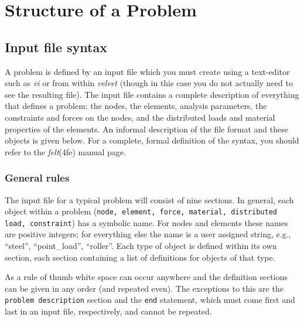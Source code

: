 
\newpage{\pagestyle{empty}\cleardoublepage}

\chapter{Structure of a \felt{} Problem}
\label{problem}

\section{Input file syntax}
\label{problem.syntax}
A \felt{} problem is defined by an input file which you must create using 
a text-editor such as {\em vi} or from within {\em velvet}
(though in this case you do not actually need to see the resulting 
file).  The input file contains a complete description of everything that 
defines a problem: the nodes, the elements, analysis parameters, 
the constraints and forces on the 
nodes, and the distributed loads and material properties of the elements.  An 
informal description of the file format and these objects is given below.  
For a complete, formal definition of the syntax, you should refer to the 
{\em felt}(4fe) manual page.

\subsection{General rules}

The input file for a typical \felt{} problem will consist of nine sections.
In general, 
each object within a problem ({\tt node, element, force, material, distributed 
load, constraint}) has a symbolic name.  For nodes and elements these names 
are positive integers; for everything else the name is a user assigned string, 
e.g., ``steel'', ``point\_load'', ``roller''.  Each type of object is defined 
within its own section, each section containing a list of definitions for 
objects of that type.  

As a rule of thumb white space can occur anywhere and the 
definition sections can be given in any order (and repeated even).  
The exceptions to this 
are the {\tt problem description} section and the {\tt end}
statement, which must come first and last in an input file, respectively, 
and cannot be repeated. 

